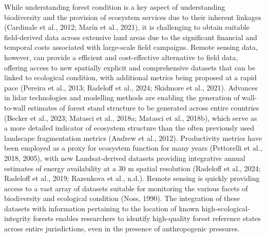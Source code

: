 \documentclass[
]{agujournal2019}
\begin{document}
While understanding forest condition is a key aspect of understanding
biodiversity and the provision of ecosystem services due to their
inherent linkages (Cardinale et al., 2012; Marín et al., 2021), it is
challenging to obtain suitable field-derived data across extensive land
areas due to the significant financial and temporal costs associated
with large-scale field campaigns. Remote sensing data, however, can
provide a efficient and cost-effective alternative to field data,
offering access to new spatially explicit and comprehensive datasets
that can be linked to ecological condition, with additional metrics
being proposed at a rapid pace (Pereira et al., 2013; Radeloff et al.,
2024; Skidmore et al., 2021). Advances in lidar technologies and
modelling methods are enabling the generation of wall-to-wall estimates
of forest stand structure to be generated across entire countries
(Becker et al., 2023; Matasci et al., 2018a; Matasci et al., 2018b),
which serve as a more detailed indicator of ecosystem structure than the
often previously used landscape fragmentation metrics (Andrew et al.,
2012). Productivity metrics have been employed as a proxy for ecosystem
function for many years (Pettorelli et al., 2018, 2005), with new
Landsat-derived datasets providing integrative annual estimates of
energy availability at a 30 m spatial resolution (Radeloff et al., 2024;
Radeloff et al., 2019; Razenkova et al., n.d.). Remote sensing is
quickly providing access to a vast array of datasets suitable for
monitoring the various facets of biodiversity and ecological condition
(Noss, 1990). The integration of these datasets with information
pertaining to the location of known high-ecological-integrity forests
enables researchers to identify high-quality forest reference states
across entire jurisdictions, even in the presence of anthropogenic
pressures.
\end{document}
